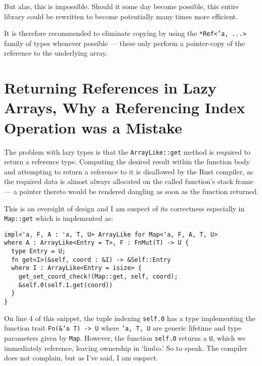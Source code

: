\documentclass{DIKU-report-variant}
\begin{document}
But alas, this is impossible. Should it some day become possible, this entire library could be
rewritten to become potentially many times more efficient.

It is therefore recommended to eliminate copying by using the \texttt{*Ref<'a, ...>} family of
types whenever possible --- these only perform a pointer-copy of the reference to the underlying
array.

\section{Returning References in Lazy Arrays, Why a Referencing Index Operation was a Mistake}

The problem with lazy types is that the \texttt{ArrayLike::get} method is required to return
a reference type. Computing the desired result within the function body and attempting to return
a reference to it is disallowed by the Rust compiler, as the required data is almost always allocated
on the called function's stack frame --- a pointer thereto would be rendered dangling as soon as the
function returned.

This is an oversight of design and I am suspect of its correctness especially in \texttt{Map::get} which
is implemented as:
\begin{lstlisting}
impl<'a, F, A : 'a, T, U> ArrayLike for Map<'a, F, A, T, U>
where A : ArrayLike<Entry = T>, F : FnMut(T) -> U {
  type Entry = U;
  fn get<I>(&self, coord : &I) -> &Self::Entry
  where I : ArrayLike<Entry = isize> {
    get_set_coord_check!(Map::get, self, coord);
    &self.0(self.1.get(coord))
  }
}
\end{lstlisting}
On line 4 of this snippet, the tuple indexing \texttt{self.0} has a type implementing
the function trait \texttt{Fn(\&'a T) -> U} where \texttt{'a, T, U} are generic lifetime
and type parameters given by \texttt{Map}. However, the function \texttt{self.0} returns
a \texttt{U}, which we immediately reference, leaving ownership in `limbo.' So to speak.
The compiler does not complain, but as I've said, I am suspect.
\end{document}
